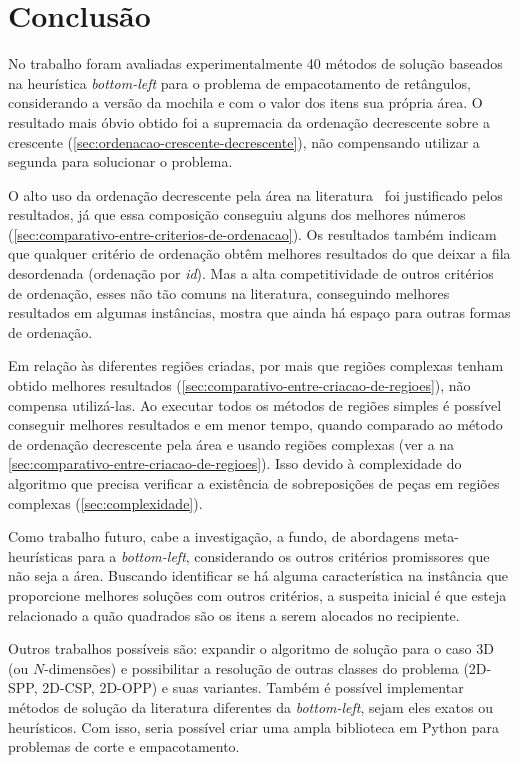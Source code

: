 \chapter*[Conclusão]{Conclusão}\label{ch:conclusao}

No trabalho foram avaliadas experimentalmente 40 métodos de solução baseados na heurística
\textit{bottom-left} para o problema de empacotamento de retângulos, considerando a versão da
mochila e com o valor dos itens sua própria área.
O resultado mais óbvio obtido foi a supremacia da ordenação decrescente sobre a crescente
(\cref{sec:ordenacao-crescente-decrescente}), não compensando utilizar a segunda para solucionar o
problema.

O alto uso da ordenação decrescente pela área na literatura~\cite{chen2019efficient} foi justificado
pelos resultados, já que essa composição conseguiu alguns dos melhores números
(\cref{sec:comparativo-entre-criterios-de-ordenacao}).
Os resultados também indicam que qualquer critério de ordenação obtêm melhores resultados do que
deixar a fila desordenada (ordenação por \textit{id}).
Mas a alta competitividade de outros critérios de ordenação, esses não tão comuns na literatura,
conseguindo melhores resultados em algumas instâncias, mostra que ainda há espaço para outras
formas de ordenação.

Em relação às diferentes regiões criadas, por mais que regiões complexas tenham obtido melhores
resultados (\cref{sec:comparativo-entre-criacao-de-regioes}), não compensa utilizá-las.
Ao executar todos os métodos de regiões simples é possível conseguir melhores resultados e em menor
tempo, quando comparado ao método de ordenação decrescente pela área e usando regiões complexas
(ver a  na \cref{sec:comparativo-entre-criacao-de-regioes}).
Isso devido à complexidade do algoritmo que precisa verificar a existência de sobreposições de peças
em regiões complexas (\cref{sec:complexidade}).

Como trabalho futuro, cabe a investigação, a fundo, de abordagens meta-heurísticas para a
\textit{bottom-left}, considerando os outros critérios promissores que não seja a área.
Buscando identificar se há alguma característica na instância que proporcione melhores soluções com
outros critérios, a suspeita inicial é que esteja relacionado a quão quadrados são os itens a serem
alocados no recipiente.

Outros trabalhos possíveis são: expandir o algoritmo de solução para o caso 3D (ou $N$-dimensões) e
possibilitar a resolução de outras classes do problema (2D-SPP, 2D-CSP, 2D-OPP) e suas variantes.
Também é possível implementar métodos de solução da literatura diferentes da \textit{bottom-left},
sejam eles exatos ou heurísticos.
Com isso, seria possível criar uma ampla biblioteca em Python para problemas de corte e empacotamento.

